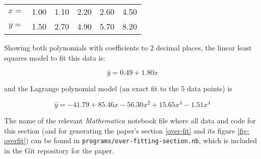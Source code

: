 \begin{center}\sf\begin{tabular}{|c|r|r|r|r|r|}\hline
$x={}$&1.00&1.10&2.20&2.60&4.50\\
$y={}$&1.50&2.70&4.90&5.70&8.20\\
\hline\end{tabular}
\end{center}

Showing both polynomials with coefficients to 2 decimal places, the linear least squares model to fit this data is:

$$
\hat{y}=0.49+1.80x
$$

and the Lagrange polynomial model (an exact fit to the 5 data points) is

$$
\hat{y}=-41.79+85.46x-56.30x^2+15.65x^3-1.51x^4
$$

The name of the relevant \emph{Mathematica\/} notebook file where all data and code for this section (and for generating the paper's section \ref{over-fit} and its figure \ref{fig-overfit}) can be found in \texttt{programs/over-fitting-section.nb}, which is included in the Git repository for the paper.